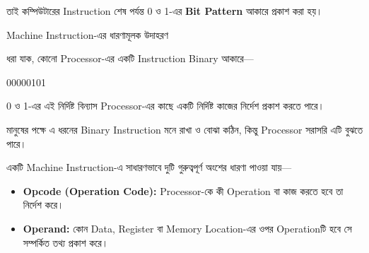 তাই কম্পিউটারের Instruction শেষ পর্যন্ত 0 ও 1-এর
\textbf{Bit Pattern} আকারে প্রকাশ করা হয়।

\begin{examplebox}{Machine Instruction-এর ধারণামূলক উদাহরণ}

ধরা যাক, কোনো Processor-এর একটি Instruction Binary আকারে—

\begin{center}

{\large\textenglish{ 00000101}}

\end{center}

0 ও 1-এর এই নির্দিষ্ট বিন্যাস Processor-এর কাছে একটি নির্দিষ্ট
কাজের নির্দেশ প্রকাশ করতে পারে।

মানুষের পক্ষে এ ধরনের Binary Instruction মনে রাখা ও বোঝা কঠিন,
কিন্তু Processor সরাসরি এটি বুঝতে পারে।

\end{examplebox}


একটি Machine Instruction-এ সাধারণভাবে দুটি গুরুত্বপূর্ণ অংশের
ধারণা পাওয়া যায়—

\begin{center}


\end{center}

\begin{itemize}

\item \textbf{Opcode (Operation Code):}
Processor-কে কী Operation বা কাজ করতে হবে তা নির্দেশ করে।

\item \textbf{Operand:}
কোন Data, Register বা Memory Location-এর ওপর Operationটি হবে
সে সম্পর্কিত তথ্য প্রকাশ করে।

\end{itemize}

